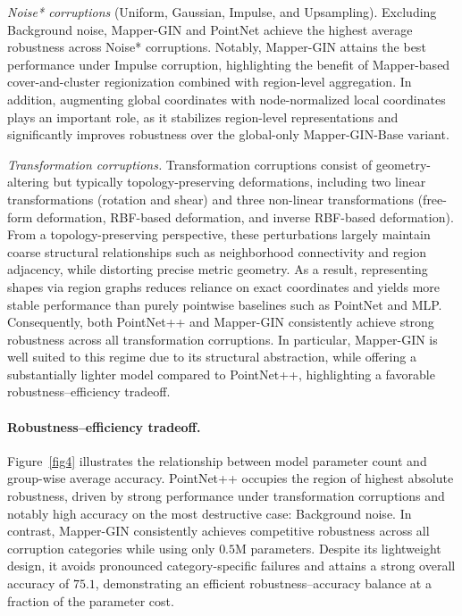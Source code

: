 \documentclass{article}
\begin{document}
\emph{Noise* corruptions} (Uniform, Gaussian, Impulse, and Upsampling).
Excluding Background noise, Mapper-GIN and PointNet achieve the highest average robustness across Noise* corruptions. Notably, Mapper-GIN attains the best performance under Impulse corruption, highlighting the benefit of Mapper-based cover-and-cluster regionization combined with region-level aggregation. In addition, augmenting global coordinates with node-normalized local coordinates plays an important role, as it stabilizes region-level representations and significantly improves robustness over the global-only Mapper-GIN-Base variant.
\vspace{3mm}

\emph{Transformation corruptions.}
Transformation corruptions consist of geometry-altering but typically topology-preserving deformations, including two linear transformations (rotation and shear) and three non-linear transformations (free-form deformation, RBF-based deformation, and inverse RBF-based deformation). 
From a topology-preserving perspective, these perturbations largely maintain coarse structural relationships such as neighborhood connectivity and region adjacency, while distorting precise metric geometry. 
As a result, representing shapes via region graphs reduces reliance on exact coordinates and yields more stable performance than purely pointwise baselines such as PointNet and MLP. Consequently, both PointNet++ and Mapper-GIN consistently achieve strong robustness across all transformation corruptions. In particular, Mapper-GIN is well suited to this regime due to its structural abstraction, while offering a substantially lighter model compared to PointNet++, highlighting a favorable robustness–efficiency tradeoff.

\paragraph{Robustness--efficiency tradeoff.}
Figure~\ref{fig4} illustrates the relationship between model parameter count and group-wise average accuracy. PointNet++ occupies the region of highest absolute robustness, driven by strong performance under transformation corruptions and notably high accuracy on the most destructive case: Background noise. In contrast, Mapper-GIN consistently achieves competitive robustness across all corruption categories while using only $0.5$M parameters. Despite its lightweight design, it avoids pronounced category-specific failures and attains a strong overall accuracy of $75.1$, demonstrating an efficient robustness--accuracy balance at a fraction of the parameter cost.
\end{document}
